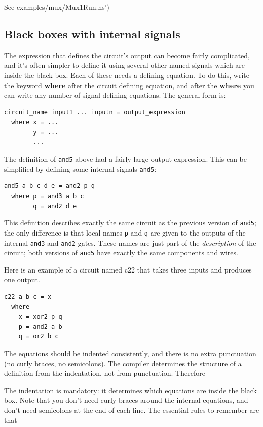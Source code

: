 \documentclass[]{svmono}
\begin{document}
See examples/mux/Mux1Run.hs')
\subsection*{Black boxes with internal signals}
\label{sec:orgd03a5a1}

The expression that defines the circuit's output can become fairly
complicated, and it's often simpler to define it using several other
named signals which are inside the black box.  Each of these needs a
defining equation.  To do this, write the keyword \textbf{where} after the
circuit defining equation, and after the \textbf{where} you can write any
number of signal defining equations. The general form is:

\begin{verbatim}
circuit_name input1 ... inputn = output_expression
  where x = ...
        y = ...
        ...
\end{verbatim}

The definition of \texttt{and5} above had a fairly large output expression.
This can be simplified by defining some internal signals \texttt{and5}:

\begin{verbatim}
and5 a b c d e = and2 p q
  where p = and3 a b c
        q = and2 d e
\end{verbatim}

This definition describes exactly the same circuit as the previous
version of \texttt{and5}; the only difference is that local names \texttt{p} and \texttt{q}
are given to the outputs of the internal \texttt{and3} and \texttt{and2} gates.
These names are just part of the \emph{description} of the circuit; both
versions of \texttt{and5} have exactly the same components and wires.

Here is an example of a circuit named c22 that takes three inputs and
produces one output.

\begin{verbatim}
c22 a b c = x
  where
    x = xor2 p q
    p = and2 a b
    q = or2 b c
\end{verbatim}

The equations should be indented consistently, and there is no extra
punctuation (no curly braces, no semicolons).  The compiler determines
the structure of a definition from the indentation, not from
punctuation.  Therefore 

The indentation is mandatory: it determines which equations are inside
the black box.  Note that you don't need curly braces around the
internal equations, and don't need semicolons at the end of each line.
The essential rules to remember are that
\end{document}
